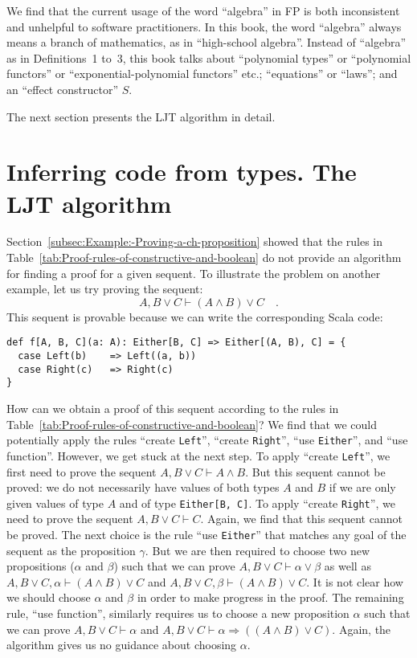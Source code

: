 We find that the current usage of the word \textsf{``}algebra\textsf{''} in FP is
both inconsistent and unhelpful to software practitioners. In this
book, the word \textsf{``}algebra\textsf{''} always means a branch of mathematics,
as in \textsf{``}high-school algebra\textsf{''}. Instead of \textsf{``}algebra\textsf{''} as in Definitions~1
to~3, this book talks about \textsf{``}polynomial types\textsf{''} or \textsf{``}polynomial
functors\textsf{''} or \textsf{``}exponential-polynomial functors\textsf{''} etc.; \textsf{``}equations\textsf{''}
or \textsf{``}laws\textsf{''}; and an \textsf{``}effect constructor\textsf{''} $S$. 

The next section presents the LJT algorithm in detail.

\chapter{Inferring code from types. The LJT algorithm\label{app:The-LJT-algorithm}}

Section~\ref{subsec:Example:-Proving-a-ch-proposition} showed that
the rules in Table~\ref{tab:Proof-rules-of-constructive-and-boolean}
do not provide an algorithm for finding a proof for a given sequent.
To illustrate the problem on another example, let us try proving the
sequent:
\[
A,B\vee C\vdash(A\wedge B)\vee C\quad.
\]
This sequent is provable because we can write the corresponding Scala
code:
\begin{lstlisting}
def f[A, B, C](a: A): Either[B, C] => Either[(A, B), C] = {
  case Left(b)    => Left((a, b))
  case Right(c)   => Right(c)
}
\end{lstlisting}
How can we obtain a proof of this sequent according to the rules in
Table~\ref{tab:Proof-rules-of-constructive-and-boolean}? We find
that we could potentially apply the rules \textsf{``}create \lstinline!Left!\textsf{''},
\textsf{``}create \lstinline!Right!\textsf{''}, \textsf{``}use \lstinline!Either!\textsf{''}, and
\textsf{``}use function\textsf{''}. However, we get stuck at the next step. To apply
\textsf{``}create \lstinline!Left!\textsf{''}, we first need to prove the sequent
$A,B\vee C\vdash A\wedge B$. But this sequent cannot be proved: we
do not necessarily have values of both types $A$ and $B$ if we are
only given values of type $A$ and of type \lstinline!Either[B, C]!.
To apply \textsf{``}create \lstinline!Right!\textsf{''}, we need to prove the sequent
$A,B\vee C\vdash C$. Again, we find that this sequent cannot be proved.
The next choice is the rule \textsf{``}use \lstinline!Either!\textsf{''} that matches
any goal of the sequent as the proposition $\gamma$. But we are then
required to choose two new propositions ($\alpha$ and $\beta$) such
that we can prove $A,B\vee C\vdash\alpha\vee\beta$ as well as $A,B\vee C,\alpha\vdash(A\wedge B)\vee C$
and $A,B\vee C,\beta\vdash(A\wedge B)\vee C$. It is not clear how
we should choose $\alpha$ and $\beta$ in order to make progress
in the proof. The remaining rule, \textsf{``}use function\textsf{''}, similarly requires
us to choose a new proposition $\alpha$ such that we can prove $A,B\vee C\vdash\alpha$
and $A,B\vee C\vdash\alpha\Rightarrow((A\wedge B)\vee C)$. Again,
the algorithm gives us no guidance about choosing $\alpha$.

